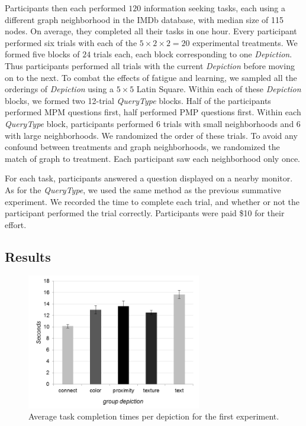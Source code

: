 Participants then each performed $120$ information seeking tasks, each using a different graph neighborhood in the IMDb database, with median size of 115 nodes. On average, they completed all their tasks in one hour. Every participant performed six trials with each of the $5 \times 2 \times 2 = 20$ experimental treatments. We formed five blocks of $24$ trials each, each block corresponding to one \textit{Depiction}. Thus participants performed all trials with the current \textit{Depiction} before moving on to the next. To combat the effects of fatigue and learning, we sampled all the orderings of \textit{Depiction} using a $5 \times 5$ Latin Square. Within each of these \textit{Depiction} blocks, we formed two 12-trial \textit{QueryType} blocks. Half of the participants performed MPM questions first, half performed PMP questions first. Within each \textit{QueryType} block, participants performed 6 trials with small neighborhoods and 6 with large neighborhoods. We randomized the order of these trials. To avoid any confound between treatments and graph neighborhoods, we randomized the match of graph to treatment. Each participant saw each neighborhood only once.

For each task, participants answered a question displayed on a nearby monitor. 
As for the \textit{QueryType}, we used the same method as the previous summative experiment.
We recorded the time to complete each trial, and whether or not the participant performed the trial correctly. Participants were paid \$10 for their effort.


\subsection{Results}
\begin{figure}[ht]
\centering
\includegraphics[width=3in]{images/depictiongraph}
\caption{Average task completion times per depiction for the first experiment.}
\label{fig:experiment1}
\end{figure}


